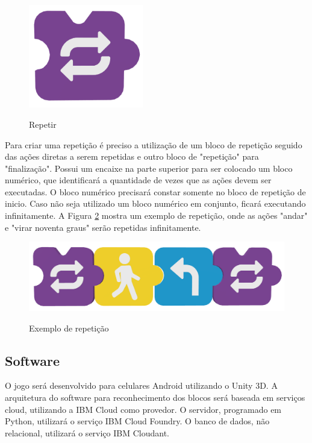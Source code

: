         \begin{figure}[H]
            \caption{Repetir}
            \centering
            \includegraphics[width=5cm]{Imagens/Cap3/Blocos/Repetir.png}
            \label{figura:repetir}
        \end{figure}
        
        Para criar uma repetição é preciso a utilização de um bloco de repetição seguido das ações diretas a serem repetidas e outro bloco de "repetição" para "finalização". Possui um encaixe na parte superior para ser colocado um bloco numérico, que identificará a quantidade de vezes que as ações devem ser executadas. O bloco numérico precisará constar somente no bloco de repetição de inicio. Caso não seja utilizado um bloco numérico em conjunto, ficará executando infinitamente. A Figura \ref{figura:exemplo_repeticao} mostra um exemplo de repetição, onde as ações "andar" e "virar noventa graus" serão repetidas infinitamente.
        
        \begin{figure}[H]
            \caption{Exemplo de repetição}
            \centering
            \includegraphics[width=\linewidth]{Imagens/Cap3/Blocos/Exemplo_Repeticao.png}
            \label{figura:exemplo_repeticao}
        \end{figure}
    
    \subsection{Software}
    O jogo será desenvolvido para celulares Android utilizando o Unity 3D. A arquitetura do software para reconhecimento dos blocos será baseada em serviços cloud, utilizando a IBM Cloud como provedor.
    O servidor, programado em Python, utilizará o serviço IBM Cloud Foundry. O banco de dados, não relacional, utilizará o serviço IBM Cloudant.
    
